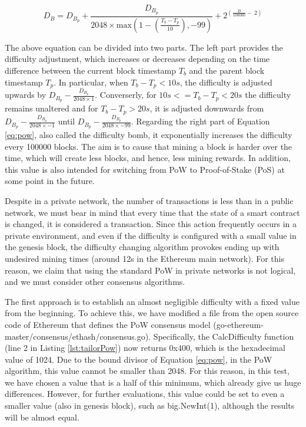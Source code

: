 \begin{equation} \label{eq:pow}
 D_B = D_{B_p} + \frac{D_{B_p}}{2048 \times \text{max}(1-(\frac{T_b - T_p}{10}), -99)} + 2^{(\frac{B}{100000} - \ 2)} 
  \end{equation}

The above equation can be divided into two parts. The left part provides the difficulty adjustment, which increases or decreases depending on the time difference between the current block timestamp $T_b$ and the parent block timestamp $T_p$. In particular, when $T_b - T_p < 10s$, the difficulty is adjusted upwards by $D_{B_p} - \frac{D_{B_p}}{2048 \times 1}$. Converserly, for $10s <= T_b - T_p < 20s$ the difficulty remains unaltered and for $T_b - T_p > 20s$, it is adjusted downwards from $D_{B_p} - \frac{D_{B_p}}{2048 \times -1}$ until $D_{B_p} - \frac{D_{B_p}}{2048 \times -99}$. Regarding the right part of Equation \ref{eq:pow}, also called the difficulty bomb, it exponentially increases the difficulty every 100000 blocks. The aim is to cause that mining a block is harder over the time, which will create less blocks, and hence, less mining rewards. In addition, this value is also intended for switching from PoW to Proof-of-Stake (PoS) at some point in the future.

Despite in a private network, the number of transactions is less than in a public network, we must bear in mind that every time that the state of a smart contract is changed, it is considered a transaction. Since this action frequently occurs in a private environment, and even if the difficulty is configured with a small value in the genesis block, the difficulty changing algorithm provokes ending up with undesired mining times (around 12s in the Ethereum main network). For this reason, we claim that using the standard PoW in private networks is not logical, and we must consider other consensus algorithms.

The first approach is to establish an almost negligible difficulty with a fixed value from the beginning. To achieve this, we have modified a file from the open source code of Ethereum that defines the PoW consensus model (go-ethereum-master/consensus/ethash/consensus.go). Specifically, the CalcDifficulty function (line 2 in Listing \ref{lst:tailorPow}) now returns 0x400, which is the hexadecimal value of 1024. Due to the bound divisor of Equation \ref{eq:pow}, in the PoW algorithm, this value cannot be smaller than 2048. For this reason, in this test, we have chosen a value that is a half of this minimum, which already give us huge differences. However, for further evaluations, this value could be set to even a smaller value (also in genesis block), such as big.NewInt(1), although the results will be almost equal.

